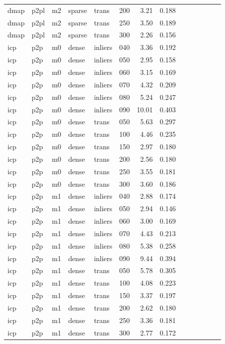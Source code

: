 \begin{table}[htbp]
\begin{tabular}{llllllrrrrrrrr}
  dmap & p2pl & m2 & sparse & trans & 200 & 3.21 & 0.188 \\
  dmap & p2pl & m2 & sparse & trans & 250 & 3.50 & 0.189 \\
  dmap & p2pl & m2 & sparse & trans & 300 & 2.26 & 0.156 \\
  icp & p2p & m0 & dense & inliers & 040 & 3.36 & 0.192 \\
  icp & p2p & m0 & dense & inliers & 050 & 2.95 & 0.158 \\
  icp & p2p & m0 & dense & inliers & 060 & 3.15 & 0.169 \\
  icp & p2p & m0 & dense & inliers & 070 & 4.32 & 0.209 \\
  icp & p2p & m0 & dense & inliers & 080 & 5.24 & 0.247 \\
  icp & p2p & m0 & dense & inliers & 090 & 10.01 & 0.403 \\
  icp & p2p & m0 & dense & trans & 050 & 5.63 & 0.297 \\
  icp & p2p & m0 & dense & trans & 100 & 4.46 & 0.235 \\
  icp & p2p & m0 & dense & trans & 150 & 2.97 & 0.180 \\
  icp & p2p & m0 & dense & trans & 200 & 2.56 & 0.180 \\
  icp & p2p & m0 & dense & trans & 250 & 3.55 & 0.181 \\
  icp & p2p & m0 & dense & trans & 300 & 3.60 & 0.186 \\
  icp & p2p & m1 & dense & inliers & 040 & 2.88 & 0.174 \\
  icp & p2p & m1 & dense & inliers & 050 & 2.94 & 0.146 \\
  icp & p2p & m1 & dense & inliers & 060 & 3.00 & 0.169 \\
  icp & p2p & m1 & dense & inliers & 070 & 4.43 & 0.213 \\
  icp & p2p & m1 & dense & inliers & 080 & 5.38 & 0.258 \\
  icp & p2p & m1 & dense & inliers & 090 & 9.44 & 0.394 \\
  icp & p2p & m1 & dense & trans & 050 & 5.78 & 0.305 \\
  icp & p2p & m1 & dense & trans & 100 & 4.08 & 0.223 \\
  icp & p2p & m1 & dense & trans & 150 & 3.37 & 0.197 \\
  icp & p2p & m1 & dense & trans & 200 & 2.62 & 0.180 \\
  icp & p2p & m1 & dense & trans & 250 & 3.36 & 0.181 \\
  icp & p2p & m1 & dense & trans & 300 & 2.77 & 0.172 \\

\end{tabular}
\end{table}
